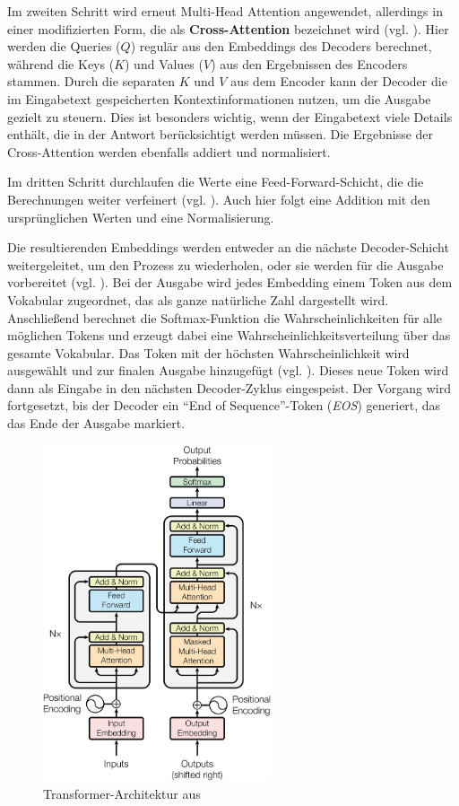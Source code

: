 Im zweiten Schritt wird erneut Multi-Head Attention angewendet, allerdings in einer modifizierten Form, die als \textbf{Cross-Attention} bezeichnet wird (vgl. \cite[S. 212]{paass.2020}). 
Hier werden die Queries (\( Q \)) regulär aus den Embeddings des Decoders berechnet, während die Keys (\( K \)) und Values (\( V \)) aus den Ergebnissen des Encoders stammen. 
Durch die separaten \( K \) und \( V \) aus dem Encoder kann der Decoder die im Eingabetext gespeicherten Kontextinformationen nutzen, um die Ausgabe gezielt zu steuern. 
Dies ist besonders wichtig, wenn der Eingabetext viele Details enthält, die in der Antwort berücksichtigt werden müssen.  
Die Ergebnisse der Cross-Attention werden ebenfalls addiert und normalisiert.

Im dritten Schritt durchlaufen die Werte eine Feed-Forward-Schicht, die die Berechnungen weiter verfeinert (vgl. \cite[S. 3]{attention}). 
Auch hier folgt eine Addition mit den ursprünglichen Werten und eine Normalisierung.

Die resultierenden Embeddings werden entweder an die nächste Decoder-Schicht weitergeleitet, um den Prozess zu wiederholen, oder sie werden für die Ausgabe vorbereitet (vgl. \cite[S. 213]{paass.2020}). 
Bei der Ausgabe wird jedes Embedding einem Token aus dem Vokabular zugeordnet, das als ganze natürliche Zahl dargestellt wird. 
Anschließend berechnet die Softmax-Funktion die Wahrscheinlichkeiten für alle möglichen Tokens und erzeugt dabei eine Wahrscheinlichkeitsverteilung über das gesamte Vokabular. 
Das Token mit der höchsten Wahrscheinlichkeit wird ausgewählt und zur finalen Ausgabe hinzugefügt (vgl. \cite[S. 213]{paass.2020}). 
Dieses neue Token wird dann als Eingabe in den nächsten Decoder-Zyklus eingespeist. 
Der Vorgang wird fortgesetzt, bis der Decoder ein \enquote{End of Sequence}-Token (\textit{EOS}) generiert, das das Ende der Ausgabe markiert.

\begin{figure}[ht]
	\centering
	\includegraphics[width=0.6\textwidth]{Bilder/ModalNet-21.png} 
	\caption{Transformer-Architektur aus \cite[S. 3]{attention}}
	\label{fig:scaled-dot}
\end{figure}